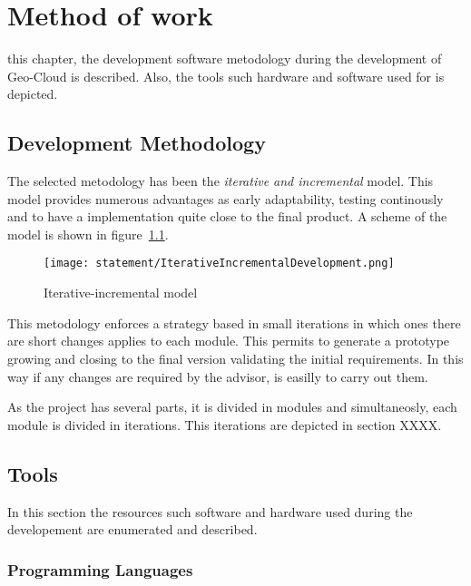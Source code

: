 \chapter{Method of work}
\label{chap:method}
 this chapter, the development software metodology during the
development of Geo-Cloud is described. Also, the tools such hardware and software used for is depicted.
 
\section{Development Methodology}
The selected metodology has been the \emph{iterative and incremental}
model. This model provides numerous advantages as early adaptability, testing
continously and to have a implementation quite close to the final product. A
scheme of the model is shown in figure~\ref{fig:IncrementalModel}.


\begin{figure}[!h]
\begin{center}
\texttt{[image: statement/IterativeIncrementalDevelopment.png]}
\caption{Iterative-incremental model}
\label{fig:IncrementalModel}
\end{center}
\end{figure}

This metodology enforces a strategy based in small iterations in which ones
there are short changes applies to each module. This permits to generate a prototype
growing and closing to the final version validating the initial requirements. In
this way if any changes are required by the advisor, is easilly to carry out
them.
 
As the project has several parts, it is divided in modules and simultaneosly,
each module is divided in iterations. This iterations are depicted in section XXXX.

\section{Tools}

In this section the resources such software and hardware used during the
developement are enumerated and described.  



\subsection{Programming Languages}

